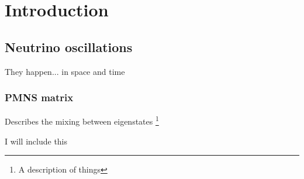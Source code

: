 \documentclass[../main.tex]{subfiles}
\begin{document}
\chapter{Introduction}
\section{Neutrino oscillations}
They happen... in space and time

\subsection{PMNS matrix}
Describes the mixing between eigenstates \footnote{A description of
things}

I will include this\cite{lamport94}

%
\end{document}
